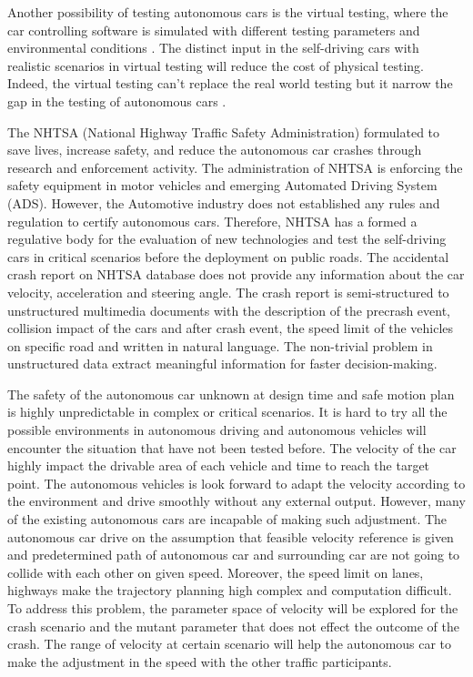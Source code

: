 Another possibility of testing autonomous cars is the virtual testing, where the car controlling software \cite{zhang2014roadview} is simulated with different testing parameters and environmental conditions \cite{tian2018deeptest}\cite{ben2016testing}. The distinct input in the self-driving cars with realistic scenarios in virtual testing will reduce the cost of physical testing. Indeed, the virtual testing can't replace the real world testing but it narrow the gap in the testing of autonomous cars \cite{sippl2016simulation}. 

The NHTSA (National Highway Traffic Safety Administration) \cite{stocker2019shared} formulated to save lives, increase safety, and reduce the autonomous car crashes through research and enforcement activity. The administration of NHTSA is enforcing the safety equipment in motor vehicles and emerging Automated Driving System (ADS). However, the Automotive industry does not established any rules and regulation to certify autonomous cars. Therefore, NHTSA has a formed a regulative body for the evaluation of new technologies and test the self-driving cars in critical scenarios before the deployment on public roads. The accidental crash report on NHTSA database does not provide any information about the car velocity, acceleration and steering angle. The crash report is semi-structured to unstructured multimedia documents with the description of the precrash event, collision impact of the cars and after crash event, the speed limit of the vehicles on specific road and written in natural language. The non-trivial problem in unstructured data extract meaningful information for faster decision-making.

The safety of the autonomous car unknown at design time and safe motion plan is highly unpredictable in complex or critical scenarios. It is hard to try all the possible environments in autonomous driving and autonomous vehicles will encounter the situation that have not been tested before\cite{althoff2018automatic}. The velocity of the car highly impact the drivable area of each vehicle and time to reach the target point. The autonomous vehicles is look forward to adapt the velocity according to the environment and drive smoothly without any external output\cite{altche2017high}. However, many of the existing autonomous cars are incapable of making such adjustment. The autonomous car drive on the assumption that feasible velocity reference is given and predetermined path of autonomous car and surrounding car are not going to collide with each other on given speed. Moreover, the speed limit on lanes, highways make the trajectory planning high complex and computation difficult. To address this problem, the parameter space of velocity will be explored for the crash scenario and the mutant parameter that does not effect the outcome of the crash. The range of velocity at certain scenario will help the autonomous car to make the adjustment in the speed with the other traffic participants. 

